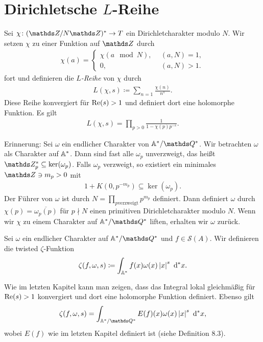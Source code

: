 \chapter{Dirichletsche $L$-Reihe}
Sei $\chi \colon (\Z/N\Z)^\ast \to T$ ein Dirichletcharakter modulo $N$.
Wir setzen $\chi$ zu einer Funktion auf $\Z$ durch
\begin{align*}
\chi(a)=\begin{cases}
\chi(a \mod N),~~&(a,N)=1,\\
0, &(a,N)>1.
\end{cases}
\end{align*}
fort und definieren die \emph{$L$-Reihe} von $\chi$ durch
\begin{align*}
L(\chi,s)\coloneqq \sum_{n=1} \frac{\chi(n)}{n^s}.
\end{align*}
Diese Reihe konvergiert für $\operatorname{Re}(s)>1$ und definiert dort eine holomorphe Funktion.
Es gilt
\begin{align*}
L(\chi,s)=\prod_{p>0} \frac{1}{1-\chi(p)p^{-s}}.
\end{align*}

Erinnerung: Sei $\omega$ ein endlicher Charakter von $\A^\ast/\Q^\ast$.
Wir betrachten $\omega$ als Charakter auf $\mathbb{A}^\ast$.
Dann sind fast alle $\omega_p$ unverzweigt, das heißt $\Z_p^\ast \subseteq \ker(\omega_p)$.
Falls $\omega_p$ verzweigt, so existiert ein minimales $\Z\ni m_p >0$ mit
\begin{align*}
1+K(0,p^{-m_p})\subseteq \ker(\omega_p).
\end{align*}
Der Führer von $\omega$ ist durch $N=\prod_{p \text{verzweigt}} p^{m_p}$ definiert.
Dann definiert $\omega$ durch $\chi(p)=\overline{\omega_p(p)}$ für $p\nmid N$ einen primitiven Dirichletcharakter modulo $N$.
Wenn wir $\chi$ zu einem Charakter auf $\A^\ast/\Q^\ast$ liften, erhalten wir $\omega$ zurück.

\begin{defi}
Sei $\omega$ ein endlicher Charakter auf $\A^\ast/\Q^\ast$ und $f \in \mathcal{S}(A)$.
Wir definieren die twisted $\zeta$-Funktion
\begin{align*}
\zeta(f,\omega,s)\coloneqq \int_{\mathbb{A}^\ast} f(x)\omega(x)\left\vert x\right\vert^s~\mathrm{d}^\ast x.
\end{align*}
\end{defi}
Wie im letzten Kapitel kann man zeigen, dass das Integral lokal gleichmäßig für $\operatorname{Re}(s)>1$ konvergiert und dort eine holomorphe Funktion definiert.
Ebenso gilt
\begin{align*}
\zeta(f,\omega,s)=\int_{\A^\ast/\Q^\ast} E(f)(x)\omega(x)\abs{x}^s~\mathrm{d}^\ast x,
\end{align*}
wobei $E(f)$ wie im letzten Kapitel definiert ist (siehe Definition 8.3).


